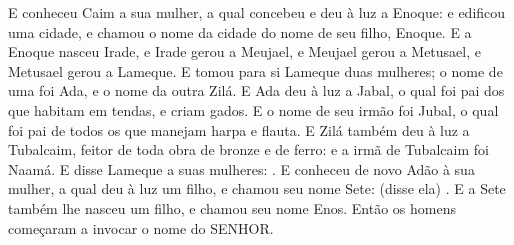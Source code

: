 {E conheceu Caim a sua mulher, a qual concebeu e deu à luz a Enoque: e edificou uma cidade, e chamou o nome da cidade do nome de seu filho, Enoque.
E a Enoque nasceu Irade, e Irade gerou a Meujael, e Meujael gerou a Metusael, e Metusael gerou a Lameque.
E tomou para si Lameque duas mulheres; o nome de uma foi Ada, e o nome da outra Zilá.
E Ada deu à luz a Jabal, o qual foi pai dos que habitam em tendas, e criam gados.
E o nome de seu irmão foi Jubal, o qual foi pai de todos os que manejam harpa e flauta.
E Zilá também deu à luz a Tubalcaim, feitor de toda obra de bronze e de ferro: e a irmã de Tubalcaim foi Naamá.
E disse Lameque a suas mulheres: .
E conheceu de novo Adão à sua mulher, a qual deu à luz um filho, e chamou seu nome Sete:  (disse ela) .
E a Sete também lhe nasceu um filho, e chamou seu nome Enos. Então os homens começaram a invocar o nome do SENHOR.

\par}

